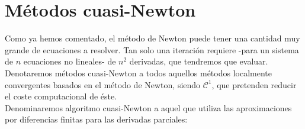 \begin{example}
%		
%		
%		
%		
%		
%		
%		
%		
%		
%		
%		
%		
%		
%		
%
	
\end{example}






\section{Métodos cuasi-Newton}

Como ya hemos comentado, el método de Newton puede tener una cantidad muy grande de ecuaciones a resolver. Tan solo una iteración requiere -para un sistema de $n$ ecuaciones no lineales- de $n^2$ derivadas, que tendremos que evaluar.\\
Denotaremos métodos cuasi-Newton a todos aquellos métodos localmente convergentes basados en el método de Newton, siendo $\mathcal{C}^1$, que pretenden reducir el coste computacional de éste.\\
Denominaremos algoritmo cuasi-Newton a aquel que utiliza las aproximaciones por diferencias finitas para las derivadas parciales:

